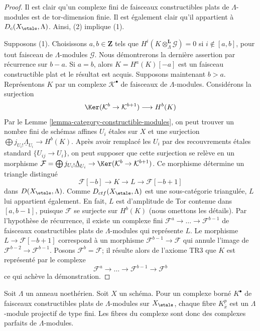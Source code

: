 \begin{proof}
Il est clair qu'un complexe fini de faisceaux constructibles
plats de $\Lambda$-modules est de tor-dimension finie.
Il est également clair qu'il appartient à $D_c(X_\etale, \Lambda)$.
Ainsi, (2) implique (1).

\medskip\noindent
Supposons (1). Choisissons $a, b \in \mathbf{Z}$ tels que
$H^i(K \otimes_\Lambda^\mathbf{L} \mathcal{G}) = 0$ si
$i \not \in [a, b]$, pour tout faisceau de $\Lambda$-modules $\mathcal{G}$.
Nous démontrerons la dernière assertion par récurrence sur $b - a$. Si
$a = b$, alors $K = H^a(K)[-a]$ est un faisceau constructible plat
et le résultat est acquis. Supposons maintenant $b > a$. Représentons $K$
par un complexe $\mathcal{K}^\bullet$ de faisceaux de $\Lambda$-modules.
Considérons la surjection
$$
\Ker(\mathcal{K}^b \to \mathcal{K}^{b + 1})
\longrightarrow
H^b(K)
$$
Par le Lemme \ref{lemma-category-constructible-modules},
on peut trouver un nombre fini de schémas affines $U_i$ étales sur $X$ et une
surjection $\bigoplus j_{U_i!}\underline{\Lambda}_{U_i} \to H^b(K)$.
Après avoir remplacé les $U_i$ par des recouvrements étales standard $\{U_{ij} \to U_i\}$,
on peut supposer que cette surjection se relève en un morphisme
$\mathcal{F} = \bigoplus j_{U_i!}\underline{\Lambda}_{U_i} \to
\Ker(\mathcal{K}^b \to \mathcal{K}^{b + 1})$.
Ce morphisme détermine un triangle distingué
$$
\mathcal{F}[-b] \to K \to L \to \mathcal{F}[-b + 1]
$$
dans $D(X_\etale, \Lambda)$. Comme $D_{ctf}(X_\etale, \Lambda)$ est une
sous-catégorie triangulée, $L$ lui appartient également. En fait, $L$ est
d'amplitude de Tor contenue dans $[a, b - 1]$, puisque $\mathcal{F}$ se surjecte sur
$H^b(K)$ (nous omettons les détails). Par l'hypothèse de récurrence, il existe
un complexe fini $\mathcal{F}^a \to \ldots \to \mathcal{F}^{b - 1}$
de faisceaux constructibles plats de $\Lambda$-modules qui représente $L$.
Le morphisme $L \to \mathcal{F}[-b + 1]$ correspond à un morphisme
$\mathcal{F}^{b-1} \to \mathcal{F}$ qui annule l'image
de $\mathcal{F}^{b-2} \to \mathcal{F}^{b-1}$. Posons $\mathcal{F}^b=\mathcal{F}$; il résulte alors
de l'axiome TR3 que $K$ est représenté par le complexe
$$
\mathcal{F}^a \to \ldots \to \mathcal{F}^{b - 1} \to \mathcal{F}^b
$$
ce qui achève la démonstration.
\end{proof}

\begin{remark}
\label{remark-projective-each-degree}
Soit $\Lambda$ un anneau noethérien. Soit $X$ un schéma.
Pour un complexe borné $K^\bullet$ de faisceaux constructibles plats de $\Lambda$-modules
sur $X_\etale$,
chaque fibre $K^p_{\overline{x}}$ est un $\Lambda$-module projectif de type fini.
Les fibres du complexe sont donc des complexes parfaits de $\Lambda$-modules.
\end{remark}

